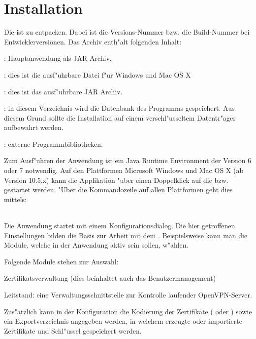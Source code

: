 \section{Installation}

%
Die \Nvma{} ist zu entpacken. Dabei ist \Nbn{} die Versions-Nummer bzw. die
Build-Nummer bei Entwicklerversionen.
%
\nl Das Archiv enth"alt folgenden Inhalt:
%
\begin{items}
 \item	\Nvmj{}: Hauptanwendung als JAR Archiv.
 \item	\Nvmw{}: dies ist die ausf"uhrbare Datei f"ur Windows und Mac OS X
 \item	\Nvms{}: dies ist das ausf"uhrbare JAR Archiv.
 \item	{}: in diesem Verzeichnis wird die Datenbank des
	Programms gespeichert. Aus diesem Grund sollte die
	Installation auf einem verschl"usseltem Datentr"ager
	aufbewahrt werden.
 \item	{}: externe Programmbibliotheken.
\end{items}
%
Zum Ausf"uhren der Anwendung ist ein Java Runtime Environment
der Version 6 oder 7 notwendig.
%
Auf den Plattformen Microsoft Windows und Mac OS X (ab Version 10.5.x)
kann die Applikation "uber einen Doppelklick auf die \Nvmw{} bzw. \Nvms{}
gestartet werden.
%
"Uber die Kommandozeile auf allen Plattformen geht dies mittels:

\\

%
Die Anwendung startet mit einem Konfigurationsdialog. Die hier getroffenen
Einstellungen bilden die Basis zur Arbeit mit dem \Nbm.
Beispielsweise kann man die Module, welche in der
Anwendung aktiv sein sollen, w"ahlen.

\nl Folgende Module stehen zur Auswahl:

\begin{items}
	\item Zertifikatsverwaltung (dies beinhaltet auch das Benutzermanagement)
	\item Leitstand: eine Verwaltungsschnittstelle zur Kontrolle laufender OpenVPN-Server.
\end{items}

\nl Zus"atzlich kann in der Konfiguration die Kodierung der Zertifikate
( oder ) sowie ein Exportverzeichnis angegeben werden,
in welchem erzeugte oder importierte Zertifikate und Schl"ussel gespeichert werden.

